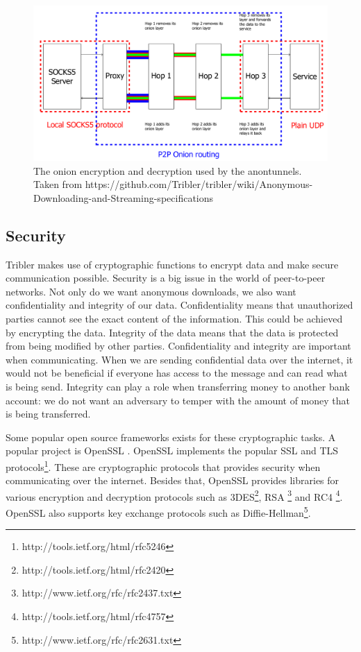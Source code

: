 			\begin{figure}[!htb]
				\centering
				\includegraphics[width=\textwidth]{graphics/onion_encryption_decryption_socks5.png}
				\caption{The onion encryption and decryption used by the anontunnels. Taken from https://github.com/Tribler/tribler/wiki/Anonymous-Downloading-and-Streaming-specifications}
				\label{fig:onion_encryption_decryption_socks5}
			\end{figure}

	\subsection{Security}
		Tribler makes use of cryptographic functions to encrypt data and make secure communication possible. Security is a big issue in the world of peer-to-peer networks. Not only do we want anonymous downloads, we also want confidentiality and integrity of our data. Confidentiality means that unauthorized parties cannot see the exact content of the information. This could be achieved by encrypting the data. Integrity of the data means that the data is protected from being modified by other parties. Confidentiality and integrity are important when communicating. When we are sending confidential data over the internet, it would not be beneficial if everyone has access to the message and can read what is being send. Integrity can play a role when transferring money to another bank account: we do not want an adversary to temper with the amount of money that is being transferred.
		
		Some popular open source frameworks exists for these cryptographic tasks. A popular project is OpenSSL \cite{openssl}. OpenSSL implements the popular SSL and TLS protocols\footnote{http://tools.ietf.org/html/rfc5246}. These are cryptographic protocols that provides security when communicating over the internet. Besides that, OpenSSL provides libraries for various encryption and decryption protocols such as 3DES\footnote{http://tools.ietf.org/html/rfc2420}, RSA \footnote{http://www.ietf.org/rfc/rfc2437.txt} and RC4 \footnote{http://tools.ietf.org/html/rfc4757}. OpenSSL also supports key exchange protocols such as Diffie-Hellman\footnote{http://www.ietf.org/rfc/rfc2631.txt}.
		
